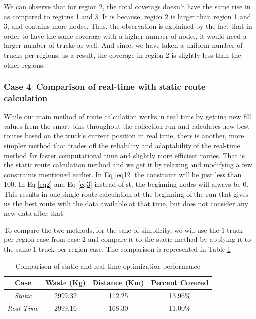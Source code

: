\documentclass[12pt]{article}
\begin{document}
We can observe that for region 2, the total coverage doesn't have the same rise in as compared to regions 1 and 3. It is because, region 2 is larger than region 1 and 3, and contains more nodes. Thus, the observation is explained by the fact that in order to have the same coverage with a higher number of nodes, it would need a larger number of trucks as well. And since, we have taken a uniform number of trucks per regions, as a result, the coverage in region 2 is slightly less than the other regions.

\subsubsection*{Case 4: Comparison of real-time with static route calculation}

While our main method of route calculation works in real time by getting new fill values from the smart bins throughout the collection run and calculates new best routes based on the truck's current position in real time, there is another, more simpler method that trades off the reliability and adaptability of the real-time method for faster computational time and slightly more efficient routes. That is the static route calculation method and we get it by relaxing and modifying a few constraints mentioned earlier. In Eq \eqref{eq12} the constraint will be just less than 100. In Eq \eqref{eq2} and Eq \eqref{eq3} instead of st, the beginning nodes will always be 0. This results in one single route calculation at the beginning of the run that gives us the best route with the data available at that time, but does not consider any new data after that.

To compare the two methods, for the sake of simplicity, we will use the 1 truck per region case from case 2 and compare it to the static method by applying it to the same 1 truck per region case. The comparison is represented in Table \ref{tab5}

\begin{table}[H]
    \centering
    \caption{Comparison of static and real-time optimization performance} \label{tab5}
    \vspace*{0.3cm}
    \begin{tabular}{|c|c|c|c|}
        \hline Case & Waste (Kg) & Distance (Km) & Percent Covered\\
        \hline \textit{Static}& 2999.32& 112.25 & 13.96\%\\
        \hline \textit{Real-Time}& 2999.16& 168.30& 11.00\%\\
        \hline
    \end{tabular}
\end{table}
\end{document}
